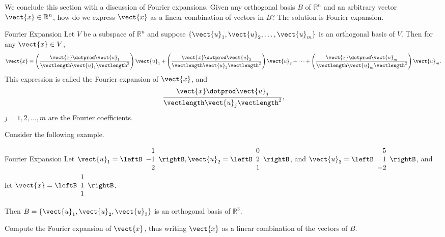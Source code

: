 We conclude this section with a discussion of Fourier expansions. Given any orthogonal basis $B$ of $\mathbb{R}^n$ and an arbitrary vector $\vect{x} \in \mathbb{R}^n$, how do we express $\vect{x}$ as a linear combination of vectors in $B$? The solution is Fourier expansion. 

\begin{theorem}{Fourier Expansion}\label{thm:fourierexpansion}
Let $V$ be a subspace of $\mathbb{R}^n$ and suppose $\{ \vect{u}_1, \vect{u}_2, \ldots, \vect{u}_m \}$
is an orthogonal basis of $V$. 
Then for any $\vect{x}\in V$,
\[ \vect{x} = 
\left(\frac{\vect{x}\dotprod \vect{u}_1}{\vectlength \vect{u}_1 \vectlength^2}\right) \vect{u}_1 +
\left(\frac{\vect{x}\dotprod \vect{u}_2}{\vectlength \vect{u}_2 \vectlength^2}\right) \vect{u}_2 +
\cdots +
\left(\frac{\vect{x}\dotprod \vect{u}_m}{\vectlength \vect{u}_m \vectlength^2}\right) \vect{u}_m.
\]
This expression is called the Fourier expansion 
of $\vect{x}$, and 
\[ \frac{\vect{x}\dotprod \vect{u}_j}{\vectlength \vect{u}_j \vectlength^2},\]
$j=1,2,\ldots,m$
are the Fourier coefficients.
\end{theorem}

Consider the following example.

\begin{example}{Fourier Expansion}\label{exa:fourier}
Let
$\vect{u}_1= \leftB\begin{array}{r} 1 \\ -1 \\ 2 \end{array}\rightB,
\vect{u}_2= \leftB\begin{array}{r} 0 \\ 2 \\ 1  \end{array}\rightB$,
and
$\vect{u}_3 =\leftB\begin{array}{r} 5 \\ 1 \\ -2 \end{array}\rightB$, 
and let 
$\vect{x} =\leftB\begin{array}{r} 1 \\ 1 \\ 1 \end{array}\rightB$.

Then $B=\{ \vect{u}_1, \vect{u}_2, \vect{u}_3\}$
is an orthogonal basis of $\mathbb{R}^3$. 

Compute the Fourier expansion of $\vect{x}$, thus writing $\vect{x}$ as  a linear combination of the vectors of $B$. 
\end{example}

